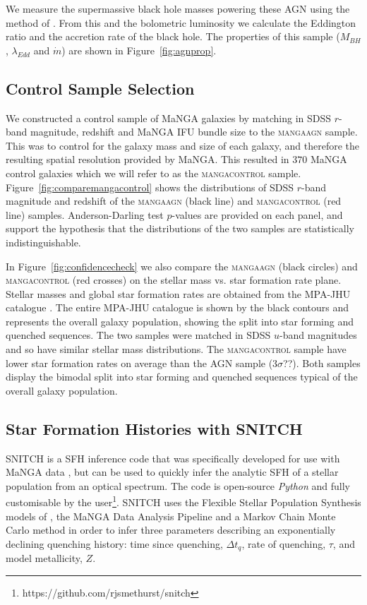 \documentclass[useAMS,usenatbib]{mn2e}
\begin{document}
We measure the supermassive black hole masses powering these AGN using the method of \cite{who}. From this and the bolometric luminosity we calculate the Eddington ratio and the accretion rate of the black hole. The properties of this sample ($M_{BH}$, $\lambda_{Edd}$ and $\dot{m}$) are shown in Figure~\ref{fig:agnprop}. 

\subsection{Control Sample Selection}

We constructed a control sample of MaNGA galaxies by matching in SDSS $r$-band magnitude, redshift and MaNGA IFU bundle size to the \textsc{mangaagn} sample. This was to control for the galaxy mass and size of each galaxy, and therefore the resulting spatial resolution provided by MaNGA. This resulted in $370$ MaNGA control galaxies which we will refer to as the \textsc{mangacontrol} sample. Figure~\ref{fig:comparemangacontrol} shows the distributions of SDSS $r$-band magnitude and redshift of the \textsc{mangaagn} (black line) and \textsc{mangacontrol} (red line) samples. Anderson-Darling test $p$-values are provided on each panel, and support the hypothesis that the distributions of the two samples are statistically indistinguishable.  

In Figure~\ref{fig:confidencecheck} we also compare the \textsc{mangaagn} (black circles) and \textsc{mangacontrol} (red crosses) on the stellar mass vs. star formation rate plane. Stellar masses and global star formation rates are obtained from the MPA-JHU catalogue \cite{kauffmann03, brinchmann04}. The entire MPA-JHU catalogue is shown by the black contours and represents the overall galaxy population, showing the split into star forming and quenched sequences. The two samples were matched in SDSS $u$-band magnitudes and so have similar stellar mass distributions. The \textsc{mangacontrol} sample have lower star formation rates on average than the AGN sample ($3\sigma$??). Both samples display the bimodal split into star forming and quenched sequences typical of the overall galaxy population.

\subsection{Star Formation Histories with SNITCH}\label{sec:snitch} 

SNITCH is a SFH inference code that was specifically developed for use with MaNGA data \cite[see][for full details, testing and proof of concept]{smethurst19a}, but can be used to quickly infer the analytic SFH of a stellar population from an optical spectrum. The code is open-source \emph{Python} and fully customisable by the user\footnote{https://github.com/rjsmethurst/snitch}. \textsc{SNITCH} uses the Flexible Stellar Population Synthesis models of \cite{conroy09}, the MaNGA Data Analysis Pipeline \cite[DAP][]{mangadap} and a Markov Chain Monte Carlo method \cite[\emph{emcee}][]{emcee13} in order to infer three parameters describing an exponentially declining quenching history: time since quenching, $\Delta t_q$, rate of quenching, $\tau$,  and model metallicity, $Z$. 
\end{document}
